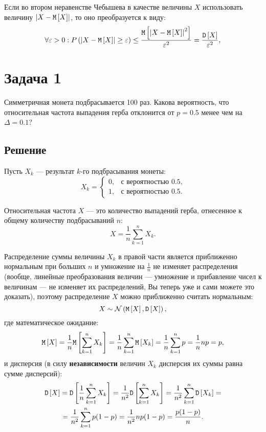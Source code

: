 Если во втором неравенстве Чебышева в качестве величины $X$ использовать величину $\left | X - \mathtt{M} \left [ X \right ] \right |$, то оно преобразуется к виду:
\begin{equation}
    \forall \varepsilon > 0 : P \left (  \left | X - \mathtt{M} \left [ X \right ] \right | \ge \varepsilon  \right ) \le \frac{\mathtt{M} \left [ \left | X - \mathtt{M} \left [ X \right ] \right |^2 \right ]}{\varepsilon^2} = \frac{\mathtt{D} \left [ X \right ]}{\varepsilon^2} ,
\end{equation}

\section*{Задача 1}

Симметричная монета подбрасывается 100 раз. Какова вероятность, что относительная частота выпадения герба отклонится от $p = 0.5$ менее чем на $\Delta = 0.1$?
\subsection*{Решение}
Пусть $X_k$ --- результат $k$-го подбрасывания монеты:
\begin{equation}
    X_k =
    \left \{
    \begin{array}{ll}
        0, & \text{с вероятностью 0.5} , \\
        1, & \text{с вероятностью 0.5} .
    \end{array}
    \right .
\end{equation}

Относительная частота $X$ --- это количество выпадений герба, отнесенное к общему количеству подбрасываний $n$:
\begin{equation}
    X = \frac{1}{n} \sum_{k=1}^n X_k .
\end{equation}

Распределение суммы величины $X_k$ в правой части является приближенно нормальным при больших $n$ и умножение на $\frac{1}{n}$ не изменяет распределения
(вообще, линейные преобразования величин --- умножение и прибавление чисел к величинам --- не изменяет их распределений, Вы теперь уже и сами можете это доказать),
поэтому распределение $X$ можно приближенно считать нормальным:
\begin{equation}
    X \sim \mathcal{N} \left ( \mathtt{M} \left [ X \right ], \mathtt{D} \left [ X \right ] \right ) ,
\end{equation}
где математическое ожидание:
\begin{equation}
    \label{1:expectation}
    \mathtt{M} \left [ X \right ]
    = \frac{1}{n} \mathtt{M} \left [ \sum_{k=1}^n X_k \right ]
    = \frac{1}{n} \sum_{k=1}^n \mathtt{M} \left [ X_k \right ]
    = \frac{1}{n} \sum_{k=1}^n p
    = \frac{1}{n} n p = p ,
\end{equation}
и дисперсия (в силу \textbf{независимости} величин $X_k$ дисперсия их суммы равна сумме дисперсий):
\begin{multline}
    \label{1:variance}
    \mathtt{D} \left [ X \right ]
    = \mathtt{D} \left [ \frac{1}{n} \sum_{k=1}^n X_k \right ]
    = \frac{1}{n^2} \mathtt{D} \left [ \sum_{k=1}^n X_k \right ]
    = \frac{1}{n^2} \sum_{k=1}^n \mathtt{D} \left [ X_k \right ] = \\
    = \frac{1}{n^2} \sum_{k=1}^n p(1-p)
    = \frac{1}{n^2} n p(1-p)
    = \frac{p(1-p)}{n} .
\end{multline}

